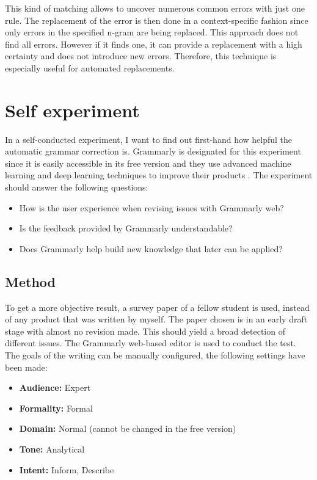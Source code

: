 \documentclass[runningheads]{llncs}
\let\OldTextregistered\textregistered
\renewcommand{\textregistered}{\OldTextregistered\xspace}
\begin{document}
This kind of matching allows to uncover numerous common errors with just one rule. The replacement of the error is then done in a context-specific fashion since only errors in the specified n-gram are being replaced. This approach does not find all errors. However if it finds one, it can provide a replacement with a high certainty and does not introduce new errors. Therefore, this technique is especially useful for automated replacements.


\section{Self experiment}
In a self-conducted experiment, I want to find out first-hand how helpful the automatic grammar correction is. Grammarly\textregistered is designated for this experiment since it is easily accessible in its free version and they use advanced machine learning and deep learning techniques to improve their products \citep{noauthor_grammarly_nodate}. The experiment should answer the following questions:

\begin{itemize}
 \item How is the user experience when revising issues with Grammarly\textregistered web?
 \item Is the feedback provided by Grammarly\textregistered understandable?
 \item Does Grammarly\textregistered help build new knowledge that later can be applied?
\end{itemize}


\subsection{Method}
To get a more objective result, a survey paper of a fellow student is used, instead of any product that was written by myself. The paper chosen is in an early draft stage with almost no revision made. This should yield a broad detection of different issues. The Grammarly\textregistered web-based editor is used to conduct the test. The goals of the writing can be manually configured, the following settings have been made:

\begin{itemize}
 \item \textbf{Audience:} Expert
 \item \textbf{Formality:} Formal
 \item \textbf{Domain:} Normal (cannot be changed in the free version)
 \item \textbf{Tone:} Analytical
 \item \textbf{Intent:} Inform, Describe
\end{itemize}
\end{document}
